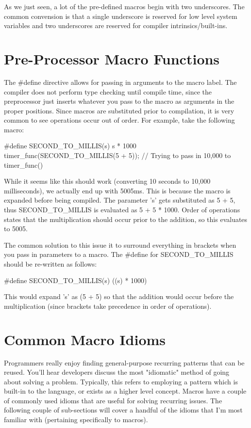 \documentclass{article}
\begin{document}
As we just seen, a lot of the pre-defined macros begin with two underscores. The common convension is that a
single underscore is reserved for low level system variables and two underscores are reserved for compiler
intrinsics/built-ins.

\section{Pre-Processor Macro Functions}

The \#define directive allows for passing in arguments to the macro label. The compiler does not perform type
checking until compile time, since the preprocessor just inserts whatever you pass to the macro as arguments
in the proper positions. Since macros are substituted prior to compilation, it is very common to see
operations occur out of order. For example, take the following macro:

\begin{cblk}
#define SECOND_TO_MILLIS(s) s * 1000
    timer_func(SECOND_TO_MILLIS(5 + 5)); // Trying to pass in 10,000 to timer_func()
\end{cblk}

While it seems like this should work (converting 10 seconds to 10,000 milliseconds), we actually end up with
5005ms. This is because the macro is expanded before being compiled. The parameter 's' gets substituted as
5 + 5, thus SECOND\_TO\_MILLIS is evaluated as 5 + 5 * 1000. Order of operations states that the
multiplication should occur prior to the addition, so this evaluates to 5005.

The common solution to this issue it to surround everything in brackets when you pass in parameters to a
macro. The \#define for SECOND\_TO\_MILLIS should be re-written as follows:

\begin{cblk}
#define SECOND_TO_MILLIS(s) ((s) * 1000)
\end{cblk}

This would expand 's' as (5 + 5) so that the addition would occur before the multiplication (since brackets
take precedence in order of operations).

\section{Common Macro Idioms}

Programmers really enjoy finding general-purpose recurring patterns that can be reused. You'll hear developers
discuss the most "idiomatic" method of going about solving a problem. Typically, this refers to employing a
pattern which is built-in to the language, or exists as a higher level concept. Macros have a couple of commonly
used idioms that are useful for solving recurring issues. The following couple of sub-sections will cover a
handful of the idioms that I'm most familiar with (pertaining specifically to macros).
\end{document}
